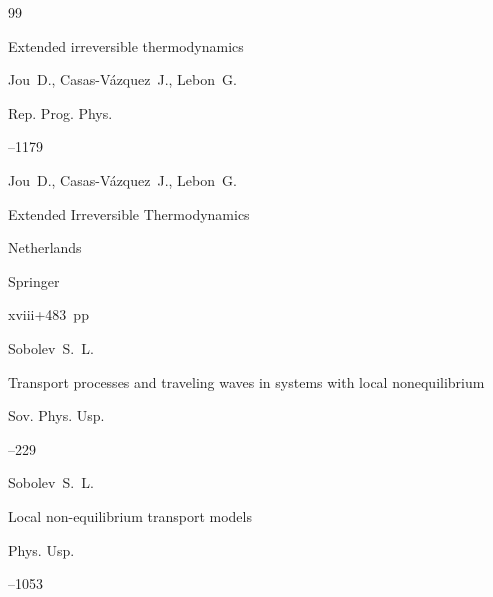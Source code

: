 \begin{thebibliography}{99}

\paper Extended irreversible thermodynamics

\by Jou~D.,  Casas-V\'azquez~J., Lebon~G.


\jour Rep. Prog. Phys. 



--1179





\by Jou~D.,  Casas-V\'azquez~J., Lebon~G.

\book Extended Irreversible Thermodynamics

\publaddr Netherlands

\publ     Springer 


\totalpages xviii+483~pp \nofrills





\by Sobolev~S.~L.

\paper Transport processes and traveling waves in systems with local nonequilibrium

\jour Sov. Phys. Usp. 



–229 






\by Sobolev~S.~L.

\paper Local non-equilibrium transport models

\jour Phys. Usp. 



–1053 










\end{thebibliography}
